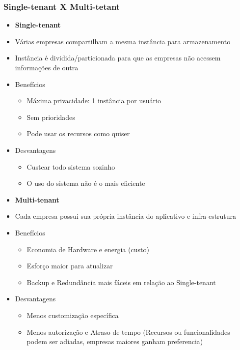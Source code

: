 \begin{frame}
	\frametitle{Single-tenant X Multi-tetant}
	\begin{multicols}{2}
		\begin{itemize}
			\item \textbf{Single-tenant}
			\item \tiny Várias empresas compartilham a mesma instância para armazenamento
			\item \tiny Instância é dividida/particionada para que as empresas não acessem informações de outra
			\item \tiny Benefícios
				\begin{itemize}
					\item \tiny Máxima privacidade: 1 instância por usuário
					\item \tiny Sem prioridades
					\item \tiny Pode usar os recursos como quiser
				\end{itemize}
			\item \tiny Desvantagens
				\begin{itemize}
					\item \tiny Custear todo sistema sozinho
					\item \tiny O uso do sistema não é o mais eficiente
				\end{itemize}
		\end{itemize}
		\columnbreak
		\begin{itemize}
			\item \textbf{Multi-tenant}
			\item \tiny Cada empresa possui sua própria instância do aplicativo e infra-estrutura
			\item \tiny Benefícios
				\begin{itemize}
					\item \tiny Economia de Hardware e energia (custo)
					\item \tiny Esforço maior para atualizar
					\item \tiny Backup e Redundância mais fáceis em relação ao Single-tenant
				\end{itemize}
			\item \tiny Desvantagens
				\begin{itemize}
					\item \tiny Menos customização específica
					\item \tiny Menos autorização e Atraso de tempo (Recursos ou funcionalidades podem ser adiadas, empresas maiores ganham preferencia)
				\end{itemize}
		\end{itemize}
		
	\end{multicols}
\end{frame}

